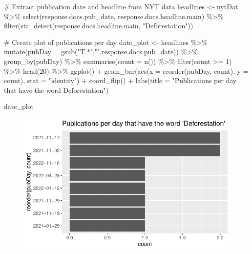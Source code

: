 \documentclass[
  letterpaper,
  DIV=11,
  numbers=noendperiod]{scrartcl}
\newenvironment{Shaded}{\begin{snugshade}}{\end{snugshade}}
\newcommand{\AttributeTok}[1]{\textcolor[rgb]{0.40,0.45,0.13}{#1}}
\newcommand{\CommentTok}[1]{\textcolor[rgb]{0.37,0.37,0.37}{#1}}
\newcommand{\DecValTok}[1]{\textcolor[rgb]{0.68,0.00,0.00}{#1}}
\newcommand{\FunctionTok}[1]{\textcolor[rgb]{0.28,0.35,0.67}{#1}}
\newcommand{\NormalTok}[1]{\textcolor[rgb]{0.00,0.23,0.31}{#1}}
\newcommand{\OtherTok}[1]{\textcolor[rgb]{0.00,0.23,0.31}{#1}}
\newcommand{\SpecialCharTok}[1]{\textcolor[rgb]{0.37,0.37,0.37}{#1}}
\newcommand{\StringTok}[1]{\textcolor[rgb]{0.13,0.47,0.30}{#1}}
\begin{document}
\begin{Shaded}
\begin{Highlighting}[]
\CommentTok{\# Extract publication date and headline from NYT data}
\NormalTok{headlines }\OtherTok{\textless{}{-}}\NormalTok{ nytDat }\SpecialCharTok{\%\textgreater{}\%}
  \FunctionTok{select}\NormalTok{(response.docs.pub\_date, response.docs.headline.main) }\SpecialCharTok{\%\textgreater{}\%}
  \FunctionTok{filter}\NormalTok{(}\FunctionTok{str\_detect}\NormalTok{(response.docs.headline.main, }\StringTok{"Deforestation"}\NormalTok{))}

\CommentTok{\# Create plot of publications per day}
\NormalTok{date\_plot }\OtherTok{\textless{}{-}}\NormalTok{ headlines }\SpecialCharTok{\%\textgreater{}\%}
  \FunctionTok{mutate}\NormalTok{(}\AttributeTok{pubDay =} \FunctionTok{gsub}\NormalTok{(}\StringTok{"T.*"}\NormalTok{,}\StringTok{""}\NormalTok{,response.docs.pub\_date)) }\SpecialCharTok{\%\textgreater{}\%}
  \FunctionTok{group\_by}\NormalTok{(pubDay) }\SpecialCharTok{\%\textgreater{}\%}
  \FunctionTok{summarise}\NormalTok{(}\AttributeTok{count =} \FunctionTok{n}\NormalTok{()) }\SpecialCharTok{\%\textgreater{}\%}
  \FunctionTok{filter}\NormalTok{(count }\SpecialCharTok{\textgreater{}=} \DecValTok{1}\NormalTok{) }\SpecialCharTok{\%\textgreater{}\%}
  \FunctionTok{head}\NormalTok{(}\DecValTok{20}\NormalTok{) }\SpecialCharTok{\%\textgreater{}\%}
  \FunctionTok{ggplot}\NormalTok{() }\SpecialCharTok{+}
  \FunctionTok{geom\_bar}\NormalTok{(}\FunctionTok{aes}\NormalTok{(}\AttributeTok{x =} \FunctionTok{reorder}\NormalTok{(pubDay, count), }\AttributeTok{y =}\NormalTok{ count), }\AttributeTok{stat =} \StringTok{"identity"}\NormalTok{) }\SpecialCharTok{+}
  \FunctionTok{coord\_flip}\NormalTok{() }\SpecialCharTok{+}
  \FunctionTok{labs}\NormalTok{(}\AttributeTok{title =} \StringTok{"Publications per day that have the word \textquotesingle{}Deforestation\textquotesingle{}"}\NormalTok{)}

\NormalTok{date\_plot}
\end{Highlighting}
\end{Shaded}

\begin{figure}[H]

{\centering \includegraphics{lab1_Ayala_files/figure-pdf/unnamed-chunk-9-1.pdf}

}

\end{figure}
\end{document}
